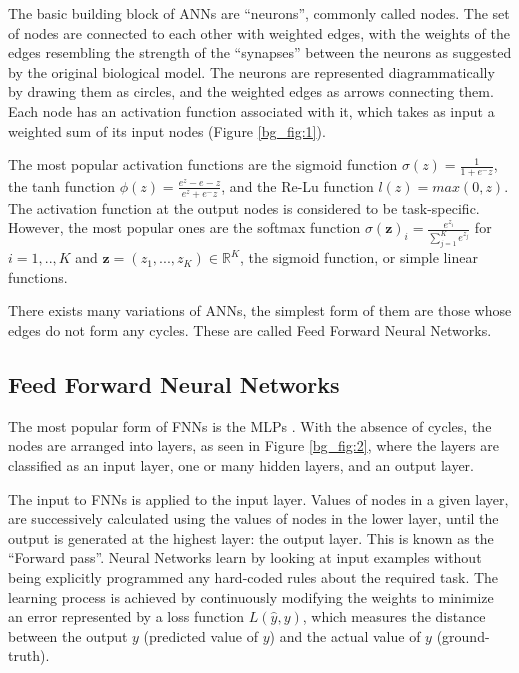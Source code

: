 The basic building block of \ac{ANN}s are \enquote{neurons}, commonly called nodes. The set of nodes are connected to each other with weighted edges, with the weights of the edges resembling the strength of the \enquote{synapses} between the neurons as suggested by the original biological model. 
The neurons are represented diagrammatically by drawing them as circles, and the weighted edges as arrows connecting them. Each node has an activation function associated with it, which takes as input a weighted sum of its input nodes (Figure \ref{bg_fig:1}). 



The most popular activation functions are the sigmoid function $  \sigma(z) =  \frac{\mathrm{1} }{\mathrm{1} + e^-z }  $, the tanh function $  \phi(z) =  \frac{ e^z - e-z }{e^z + e^-z }  $, and the Re-Lu function $ l(z) = max(0,z) $. The activation function at the output nodes is considered to be task-specific. However, the most popular ones are the softmax function $ \sigma(\mathbf{z})_i = \frac{ e^ {z_i} }{ \sum_{j=1}^{K} e^{z_j} }$ for $i=1,..,K$ and $\mathbf{z}=(z_1,...,z_K) \in \mathds{R}^K $, the sigmoid function, or simple linear functions.


There exists many variations of \ac{ANN}s, the simplest form of them are those whose edges do not form any cycles. These are called Feed Forward Neural Networks.


\subsection{Feed Forward Neural Networks}
\label{bg:s2_sub1}

The most popular form of \ac{FNN}s is the \ac{MLP}s \cite{rumelhart1985learning} \cite{werbos1988generalization} \cite{bishop1995neural}.
With the absence of cycles, the nodes are arranged into layers, as seen in Figure \ref{bg_fig:2}, where the layers are classified as an input layer, one or many hidden layers, and an output layer. 


The input to \ac{FNN}s is applied to the input layer. Values of nodes in a given layer, are successively calculated using the values of nodes in the lower layer, until the output is generated at the highest layer: the output layer. This is known as the \enquote{Forward pass}.
Neural Networks learn by looking at input examples without being explicitly programmed any hard-coded rules about the required task. The learning process is achieved by continuously modifying the weights to minimize an error represented by a loss function $ L(\widehat{y}, y) $, which measures the distance between the output $y$ (predicted value of $y$) and the actual value of $y$ (ground-truth).

